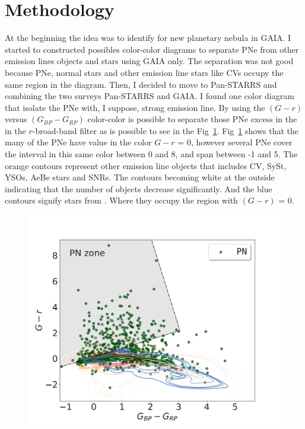 \documentclass[fleqn,usenatbib]{mnras}
\begin{document}
\section{Methodology}
\label{sec:metho}

At the beginning the idea was to identify for new planetary nebula in GAIA.
I started to constructed possibles color-color diagrams to separate PNe from
other emission lines objects and stars using GAIA only. The separation was not
good because PNe, normal stars and other emission line stars like CVs occupy the same region
in the diagram. Then, I decided to move to Pan-STARRS and combining the two
surveys Pan-STARRS and GAIA. I found one color diagram that isolate the PNe
with, I suppose, strong \ha{} emission line. By using the \((G - r)\) versus \((G_{BP} - G_{RP})\)
color-color is possible to separate those PNe excess in the in the $r$-broad-band
filter as is possible to see in the Fig~\ref{fig:gaia-ps}. Fig~\ref{fig:gaia-ps}
shows that the many of the PNe have value in the color \(G - r\) = 0, however several
PNe cover the interval in this same color between 0 and 8, and span between -1 and 5.
The orange contours represent other emission line objects that includes CV, SySt,
YSOs, AeBe stars and SNRs. The contours becoming white at the outside indicating
that the number of objects decrease significantly. And the blue contours signify
stars from \citet{Smart:2021}. Where they occupy the region with \((G - r)\) = 0.

\begin{figure}
\centering
  \includegraphics[width=0.9\linewidth]{Figs/color-diagram-ps-gaiaEDR3.pdf}
  \caption{} 
  \label{fig:gaia-ps}
\end{figure}
\end{document}
